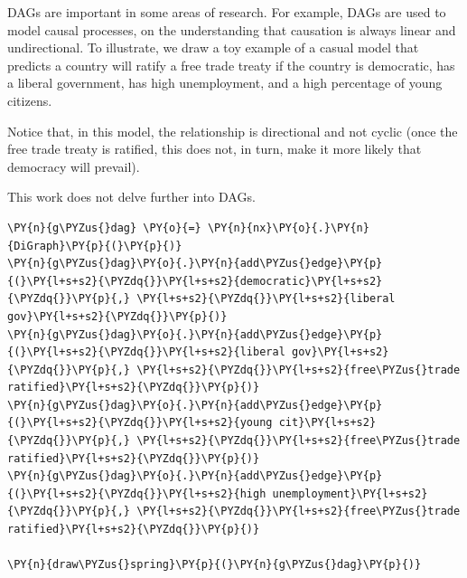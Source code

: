DAGs are important in some areas of research. For example, DAGs are used
to model causal processes, on the understanding that causation is always
linear and undirectional. To illustrate, we draw a toy example of a
casual model that predicts a country will ratify a free trade treaty if
the country is democratic, has a liberal government, has high
unemployment, and a high percentage of young citizens.

Notice that, in this model, the relationship is directional and not
cyclic (once the free trade treaty is ratified, this does not, in turn,
make it more likely that democracy will prevail).

This work does not delve further into DAGs.

    \begin{tcolorbox}[breakable, size=fbox, boxrule=1pt, pad at break*=1mm,colback=cellbackground, colframe=cellborder]
\begin{Verbatim}[commandchars=\\\{\}]
\PY{n}{g\PYZus{}dag} \PY{o}{=} \PY{n}{nx}\PY{o}{.}\PY{n}{DiGraph}\PY{p}{(}\PY{p}{)}
\PY{n}{g\PYZus{}dag}\PY{o}{.}\PY{n}{add\PYZus{}edge}\PY{p}{(}\PY{l+s+s2}{\PYZdq{}}\PY{l+s+s2}{democratic}\PY{l+s+s2}{\PYZdq{}}\PY{p}{,} \PY{l+s+s2}{\PYZdq{}}\PY{l+s+s2}{liberal gov}\PY{l+s+s2}{\PYZdq{}}\PY{p}{)}
\PY{n}{g\PYZus{}dag}\PY{o}{.}\PY{n}{add\PYZus{}edge}\PY{p}{(}\PY{l+s+s2}{\PYZdq{}}\PY{l+s+s2}{liberal gov}\PY{l+s+s2}{\PYZdq{}}\PY{p}{,} \PY{l+s+s2}{\PYZdq{}}\PY{l+s+s2}{free\PYZus{}trade ratified}\PY{l+s+s2}{\PYZdq{}}\PY{p}{)}
\PY{n}{g\PYZus{}dag}\PY{o}{.}\PY{n}{add\PYZus{}edge}\PY{p}{(}\PY{l+s+s2}{\PYZdq{}}\PY{l+s+s2}{young cit}\PY{l+s+s2}{\PYZdq{}}\PY{p}{,} \PY{l+s+s2}{\PYZdq{}}\PY{l+s+s2}{free\PYZus{}trade ratified}\PY{l+s+s2}{\PYZdq{}}\PY{p}{)}
\PY{n}{g\PYZus{}dag}\PY{o}{.}\PY{n}{add\PYZus{}edge}\PY{p}{(}\PY{l+s+s2}{\PYZdq{}}\PY{l+s+s2}{high unemployment}\PY{l+s+s2}{\PYZdq{}}\PY{p}{,} \PY{l+s+s2}{\PYZdq{}}\PY{l+s+s2}{free\PYZus{}trade ratified}\PY{l+s+s2}{\PYZdq{}}\PY{p}{)}

\PY{n}{draw\PYZus{}spring}\PY{p}{(}\PY{n}{g\PYZus{}dag}\PY{p}{)}
\end{Verbatim}
\end{tcolorbox}

    \begin{center}
    \end{center}
    { \hspace*{\fill} \\}
    
